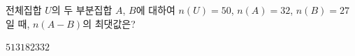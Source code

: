전체집합 $U$의 두 부분집합 $A$, $B$에 대하여 $n(U)=50$, $n(A)=32$, $n(B)=27$일 때, $n(A-B)$의 최댓값은?
\begin{choices32}{$5$}{$13$}{$18$}{$23$}{$32$}\end{choices32}
